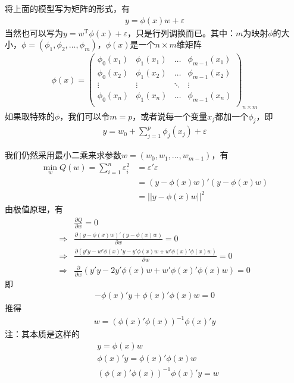             将上面的模型写为矩阵的形式，有
            \begin{align*}
            y = \phi(x)w + \varepsilon
            \end{align*}
            当然也可以写为$y = w^{\mathrm{T}}\phi(x)+\varepsilon$，只是行列调换而已。其中：$m$为映射$\phi$的大小，$\phi = (\phi_1,\phi_2,\dots,\phi_m)$，$\phi(x)$是一个$n\times m$维矩阵
            \begin{align*}
            \phi(x) =
            \begin{pmatrix}
            \phi_0(x_1)&\phi_1(x_1)&\dots&\phi_{m-1}(x_1)\\
            \phi_0(x_2)&\phi_1(x_2)&\dots&\phi_{m-1}(x_2)\\
            \vdots&\vdots&\ddots&\vdots\\
            \phi_0(x_n)&\phi_1(x_n)&\dots&\phi_{m-1}(x_n)\\
            \end{pmatrix}
            _{n\times m}
            \end{align*}
            如果取特殊的$\phi$，我们可以令$m = p$，或者说每一个变量$x_j$都加一个$\phi_j$，即
            \begin{align*}
            y = w_0 + \sum_{j = 1}^p\phi_j(x_j)+\varepsilon
            \end{align*}
            \par
            我们仍然采用最小二乘来求参数$w = (w_0,w_1,\dots,w_{m-1})$，有
            \begin{align*}
            \min_w  Q(w) = \sum_{i=1}^n \varepsilon_i^2 &= \varepsilon '\varepsilon \\
            &=(y - \phi(x)w) '(y - \phi(x)w)\\
            &=||y - \phi(x)w||^2
            \end{align*}
            由极值原理，有
            \begin{align*}
            &\frac{\partial Q}{\partial w}= 0\\
            \Rightarrow {}& \frac{\partial (y - \phi(x)w) '(y - \phi(x)w)}{\partial w} = 0\\
            \Rightarrow {}& \frac{\partial(y'y - w'\phi(x)'y - y'\phi(x)w + w'\phi(x)'\phi(x)w)}{\partial w} = 0\\
            \Rightarrow {}&\frac{\partial }{\partial w}(y'y - 2y'\phi(x)w+w'\phi(x)'\phi(x)w) = 0
            \end{align*}
            即
            \begin{align*}
            -\phi(x)'y+\phi(x)'\phi(x)w = 0
            \end{align*}
            推得
            \begin{align}
            \label{权重w计算公式}
            w = (\phi(x)'\phi(x))^{-1}\phi(x)'y
            \end{align}
            注：其本质是这样的
            \begin{align*}
            &y = \phi(x)w\\
            &\phi(x)'y = \phi(x)'\phi(x)w\\
            &(\phi(x)'\phi(x))^{-1}\phi(x)'y = w
            \end{align*}

